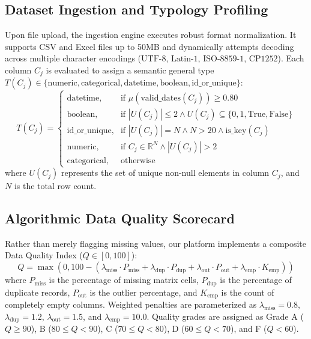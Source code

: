 \documentclass[10pt,journal,compsoc]{IEEEtran}
\begin{document}
\subsection{Dataset Ingestion and Typology Profiling}
Upon file upload, the ingestion engine executes robust format normalization. It supports CSV and Excel files up to 50MB and dynamically attempts decoding across multiple character encodings ($\text{UTF-8}$, $\text{Latin-1}$, $\text{ISO-8859-1}$, $\text{CP1252}$). Each column $C_j$ is evaluated to assign a semantic general type $T(C_j) \in \{\text{numeric}, \text{categorical}, \text{datetime}, \text{boolean}, \text{id\_or\_unique}\}$:
\begin{equation}
T(C_j) = 
\begin{cases} 
\text{datetime}, & \text{if } \mu(\text{valid\_dates}(C_j)) \ge 0.80 \\
\text{boolean}, & \text{if } |U(C_j)| \le 2 \land U(C_j) \subseteq \{0, 1, \text{True}, \text{False}\} \\
\text{id\_or\_unique}, & \text{if } |U(C_j)| = N \land N > 20 \land \text{is\_key}(C_j) \\
\text{numeric}, & \text{if } C_j \in \mathbb{R}^N \land |U(C_j)| > 2 \\
\text{categorical}, & \text{otherwise}
\end{cases}
\end{equation}
where $U(C_j)$ represents the set of unique non-null elements in column $C_j$, and $N$ is the total row count.

\subsection{Algorithmic Data Quality Scorecard}
Rather than merely flagging missing values, our platform implements a composite Data Quality Index ($Q \in [0, 100]$):
\begin{equation}
Q = \max\left(0, 100 - (\lambda_{\text{miss}} \cdot P_{\text{miss}} + \lambda_{\text{dup}} \cdot P_{\text{dup}} + \lambda_{\text{out}} \cdot P_{\text{out}} + \lambda_{\text{emp}} \cdot K_{\text{emp}})\right)
\end{equation}
where $P_{\text{miss}}$ is the percentage of missing matrix cells, $P_{\text{dup}}$ is the percentage of duplicate records, $P_{\text{out}}$ is the outlier percentage, and $K_{\text{emp}}$ is the count of completely empty columns. Weighted penalties are parameterized as $\lambda_{\text{miss}} = 0.8$, $\lambda_{\text{dup}} = 1.2$, $\lambda_{\text{out}} = 1.5$, and $\lambda_{\text{emp}} = 10.0$. Quality grades are assigned as Grade A ($Q \ge 90$), B ($80 \le Q < 90$), C ($70 \le Q < 80$), D ($60 \le Q < 70$), and F ($Q < 60$).
\end{document}
